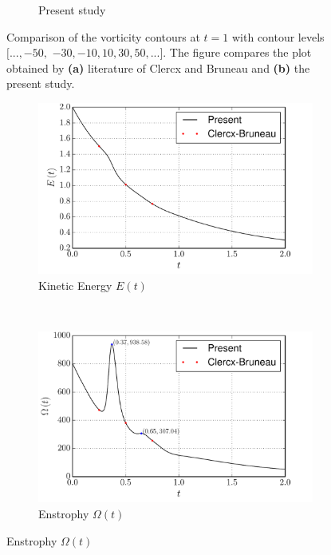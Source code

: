 \begin{figure}[!t]
\begin{subfigure}[t]{0.45\textwidth}
             \caption{Present study}
             \label{fig:dipole_contourLine_t1p0}
     \end{subfigure}
     \caption{Comparison of the vorticity contours at $t=1$ with contour levels $[...,-50,$ $-30,-10,10,30,50,...]$. The figure compares the plot obtained by \textbf{(a)} literature of Clercx and Bruneau \cite{Clercx2006a} and \textbf{(b)} the present study.}
     \label{fig:vorticity_contour_comparison}
	\end{figure}
	
	\begin{figure}[!p]
     \centering
     \begin{subfigure}[t]{0.49\textwidth}
             \includegraphics[width=\textwidth]{figures/eulerian/dipole_KineticEnergy_comparison.pdf}
             \caption{Kinetic Energy $E(t)$}
             \label{fig:dipole_KineticEnergy_comparison}
     \end{subfigure}%
     ~ %
     \begin{subfigure}[t]{0.49\textwidth}
             \includegraphics[width=\textwidth]{figures/eulerian/dipole_Enstrophy_comparison.pdf}
             \caption{Enstrophy $\Omega(t)$}
             \label{fig:dipole_Enstrophy_comparison}
     \end{subfigure}
     

\end{figure}
